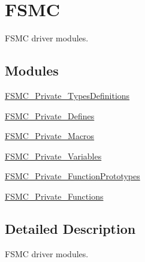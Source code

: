 \hypertarget{group___f_s_m_c}{\section{F\-S\-M\-C}
\label{group___f_s_m_c}
}


F\-S\-M\-C driver modules.  


\subsection*{Modules}
\begin{DoxyCompactItemize}
\item 
\hyperlink{group___f_s_m_c___private___types_definitions}{F\-S\-M\-C\-\_\-\-Private\-\_\-\-Types\-Definitions}
\item 
\hyperlink{group___f_s_m_c___private___defines}{F\-S\-M\-C\-\_\-\-Private\-\_\-\-Defines}
\item 
\hyperlink{group___f_s_m_c___private___macros}{F\-S\-M\-C\-\_\-\-Private\-\_\-\-Macros}
\item 
\hyperlink{group___f_s_m_c___private___variables}{F\-S\-M\-C\-\_\-\-Private\-\_\-\-Variables}
\item 
\hyperlink{group___f_s_m_c___private___function_prototypes}{F\-S\-M\-C\-\_\-\-Private\-\_\-\-Function\-Prototypes}
\item 
\hyperlink{group___f_s_m_c___private___functions}{F\-S\-M\-C\-\_\-\-Private\-\_\-\-Functions}
\end{DoxyCompactItemize}


\subsection{Detailed Description}
F\-S\-M\-C driver modules. 
